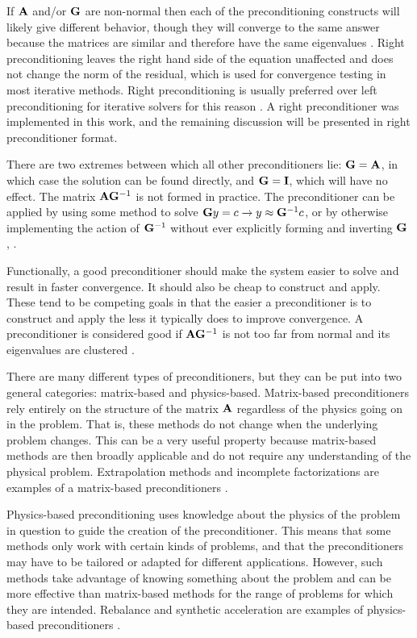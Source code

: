 If $\mathbf{A}$ and/or $\mathbf{G}$ are non-normal then each of the preconditioning constructs will likely give different behavior, though they will converge to the same answer because the matrices are similar and therefore have the same eigenvalues  \cite{Benzi2002}. Right preconditioning leaves the right hand side of the equation unaffected and does not change the norm of the residual, which is used for convergence testing in most iterative methods. Right preconditioning is usually preferred over left preconditioning for iterative solvers for this reason \cite{Knoll2004}. A right preconditioner was implemented in this work, and the remaining discussion will be presented in right preconditioner format. 

There are two extremes between which all other preconditioners lie: $\mathbf{G} = \mathbf{A}$, in which case the solution can be found directly, and $\mathbf{G} = \mathbf{I}$, which will have no effect. The matrix $\mathbf{A}\mathbf{G}^{-1}$ is not formed in practice. The preconditioner can be applied by using some method to solve $\mathbf{G}y=c \to y \approx \mathbf{G}^{-1}c$, or by otherwise implementing the action of $\mathbf{G}^{-1}$ without ever explicitly forming and inverting $\mathbf{G}$ \cite{Benzi2002}, \cite{Trefethen1997}. 

Functionally, a good preconditioner should make the system easier to solve and result in faster convergence. It should also be cheap to construct and apply. These tend to be competing goals in that the easier a preconditioner is to construct and apply the less it typically does to improve convergence. A preconditioner is considered good if $\mathbf{A}\mathbf{G}^{-1}$ is not too far from normal and its eigenvalues are clustered \cite{Trefethen1997}. 

There are many different types of preconditioners, but they can be put into two general categories: matrix-based and physics-based. Matrix-based preconditioners rely entirely on the structure of the matrix $\mathbf{A}$ regardless of the physics going on in the problem. That is, these methods do not change when the underlying problem changes. This can be a very useful property because matrix-based methods are then broadly applicable and do not require any understanding of the physical problem. Extrapolation methods and incomplete factorizations are examples of a matrix-based preconditioners \cite{Trefethen1997}.

Physics-based preconditioning uses knowledge about the physics of the problem in question to guide the creation of the preconditioner. This means that some methods only work with certain kinds of problems, and that the preconditioners may have to be tailored or adapted for different applications. However, such methods take advantage of knowing something about the problem and can be more effective than matrix-based methods for the range of problems for which they are intended. Rebalance and synthetic acceleration are examples of physics-based preconditioners \cite{Trefethen1997}.

